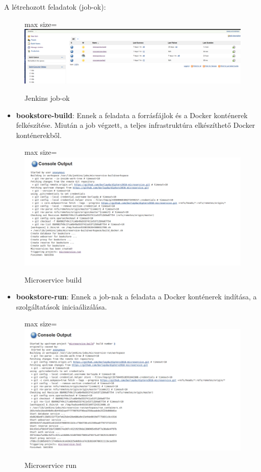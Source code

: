 \documentclass[11pt,magyar,a4paper,oneside,]{report}
\providecommand{\tightlist}{%
  \setlength{\itemsep}{0pt}\setlength{\parskip}{0pt}}
\let\Oldincludegraphics\includegraphics
\renewcommand{\includegraphics}[1]{
\begin{adjustbox}{max size={\textwidth}{\textheight}}
    \Oldincludegraphics[scale=0.6]{#1}%
\end{adjustbox}
}
\begin{document}
A létrehozott feladatok (job-ok):

\begin{figure}[htbp]
\centering
\includegraphics{img/jenkins-jobs.png}
\caption{Jenkins job-ok}
\end{figure}

\begin{itemize}
\tightlist
\item
  \textbf{bookstore-build}: Ennek a feladata a forrásfájlok és a Docker
  konténerek felkészítése. Miután a job végzett, a teljes infrastruktúra
  elkészíthető Docker konténerekből.
\end{itemize}

\begin{figure}[htbp]
\centering
\includegraphics{img/jenkins-build.png}
\caption{Microservice build}
\end{figure}

\begin{itemize}
\tightlist
\item
  \textbf{bookstore-run}: Ennek a job-nak a feladata a Docker konténerek
  indítása, a szolgáltatások iniciaálizálása.
\end{itemize}

\begin{figure}[htbp]
\centering
\includegraphics{img/jenkins-run.png}
\caption{Microservice run}
\end{figure}
\end{document}
